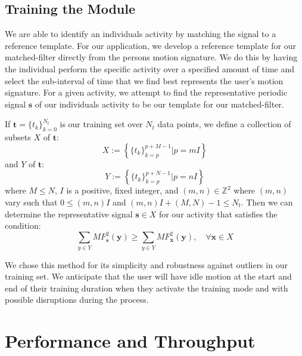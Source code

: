 \documentclass[journal]{IEEEtran}
\begin{document}
\subsection{Training the Module} \label{sec:training}
We are able to identify an individual\textquotesingle s activity by matching the signal to a reference template.
For our application, we develop a reference template for our matched-filter directly from the person\textquotesingle s motion signature.
We do this by having the individual perform the specific activity over a specified amount of time and select the sub-interval of time that we find best represents the user's motion signature.
For a given activity, we attempt to find the representative periodic signal $\textbf{s}$ of our individual\textquotesingle s activity to be our template for our matched-filter.

If $\textbf{t} = \{t_k\}_{k=0}^{N_t}$ is our training set over $N_t$ data points, we define a collection of subsets $X$ of $\textbf{t}$:
%
\begin{equation} \label{eq:X_subsets_of_training_eq}
X := \left \{ \{t_k\}_{k=p}^{p+M-1} | p=mI \right \}
\end{equation}
%
and $Y$ of $\textbf{t}$:
%
\begin{equation} \label{eq:Y_subsets_of_training_eq}
Y := \left \{ \{t_k\}_{k=p}^{p+N-1} | p=nI \right \}
\end{equation}
%
where $M \leq N$, $I$ is a positive, fixed integer, and $(m,n) \in \mathbb{Z}^2$ where $(m,n)$ vary such that $0 \leq (m,n)I$ and $(m,n)I + (M,N) - 1 \leq N_t$. Then we can determine the representative signal $\textbf{s} \in X$ for our activity that satisfies the condition:
%
\begin{equation} \label{eq:s_condition}
\sum_{y \in Y}MF^2_{\textbf{s}}(\textbf{y}) \geq \sum_{y \in Y}MF^2_{\textbf{x}}(\textbf{y}), \quad \forall \textbf{x} \in X
\end{equation}

We chose this method for its simplicity and robustness against outliers in our training set. We anticipate that the user will have idle motion at the start and end of their training duration when they activate the training mode and with possible disruptions during the process.
%
\section{Performance and Throughput}
%
\end{document}
